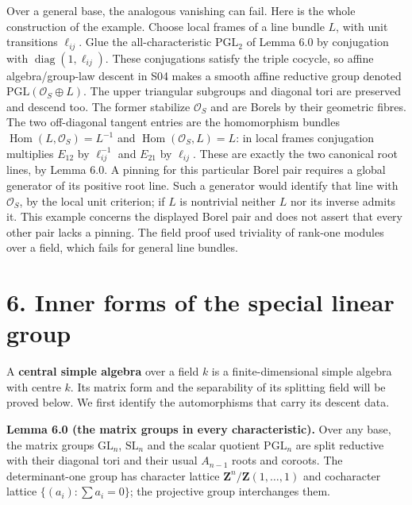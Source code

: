 \documentclass[11pt,a4paper,openany]{report}
\begin{document}
Over a general base, the analogous vanishing can fail. Here is the whole construction of the example. Choose local frames of a line bundle \(L\), with unit transitions \(\ell_{ij}\). Glue the all-characteristic \(\mathrm{PGL}_2\) of Lemma 6.0 by conjugation with \(\operatorname{diag}(1,\ell_{ij})\). These conjugations satisfy the triple cocycle, so affine algebra/group-law descent in S04 makes a smooth affine reductive group denoted \(\mathrm{PGL}(\mathcal O_S\oplus L)\). The upper triangular subgroups and diagonal tori are preserved and descend too. The former stabilize \(\mathcal O_S\) and are Borels by their geometric fibres. The two off-diagonal tangent entries are the homomorphism bundles \(\operatorname{Hom}(L,\mathcal O_S)=L^{-1}\) and \(\operatorname{Hom}(\mathcal O_S,L)=L\): in local frames conjugation multiplies \(E_{12}\) by \(\ell_{ij}^{-1}\) and \(E_{21}\) by \(\ell_{ij}\). These are exactly the two canonical root lines, by Lemma 6.0. A pinning for this particular Borel pair requires a global generator of its positive root line. Such a generator would identify that line with \(\mathcal O_S\), by the local unit criterion; if \(L\) is nontrivial neither \(L\) nor its inverse admits it. This example concerns the displayed Borel pair and does not assert that every other pair lacks a pinning. The field proof used triviality of rank-one modules over a field, which fails for general line bundles.

\section{6. Inner forms of the special linear group}\label{AG-RG-06-inner-forms-of-the-special-linear-group}

A \textbf{central simple algebra} over a field \(k\) is a finite-dimensional simple algebra with centre \(k\). Its matrix form and the separability of its splitting field will be proved below. We first identify the automorphisms that carry its descent data.

\textbf{Lemma 6.0 (the matrix groups in every characteristic).} Over any base, the matrix groups \(\mathrm{GL}_n\), \(\mathrm{SL}_n\) and the scalar quotient \(\mathrm{PGL}_n\) are split reductive with their diagonal tori and their usual \(A_{n-1}\) roots and coroots. The determinant-one group has character lattice \(\mathbf Z^n/\mathbf Z(1,\ldots,1)\) and cocharacter lattice \(\{(a_i):\sum a_i=0\}\); the projective group interchanges them.
\end{document}
